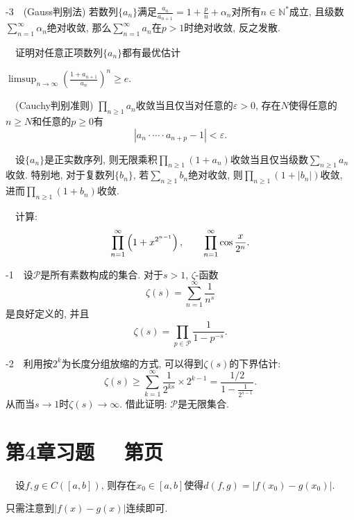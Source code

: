-3~~(Gauss判别法) 若数列$\{ a_n \}$满足$\frac{a_n}{a_{n+1}}=1+\frac{p}{n} +\alpha _n$对所有$n \in \mathbb{N}^*$成立, 且级数$\sum_{n=1}^{\infty} \alpha _n$绝对收敛, 那么$\sum_{n=1}^{\infty} a_n$在$p>1$时绝对收敛, 反之发散. 
\vspace{1em}

~~证明对任意正项数列$\{ a_n \}$都有{\color{blue}最优}估计
\begin{center}
	$\displaystyle \limsup_{n\to \infty} \left(\frac{1+a_{n+1}}{a_n} \right)^n \geq e.$
\end{center}

~~(Cauchy判别准则) $\prod_{n \geq 1}a_n$收敛当且仅当对任意的$\varepsilon >0$, 存在$N$使得任意的$n \geq N$和任意的$p \geq 0$有$$|a_n \cdot \cdots \cdot a_{n+p}-1|<\varepsilon .$$

~~设$\{ a_n \}$是正实数序列, 则无限乘积$\prod_{n \geq 1} (1+a_n)$收敛当且仅当级数$\sum_{n\geq 1}a_n$收敛. 特别地, 对于复数列$\{ b_n \}$, 若$\sum_{n\geq 1}b_n$绝对收敛, 则$\prod_{n \geq 1} (1+|b_n|)$收敛, 进而$\prod_{n \geq 1} (1+b_n)$收敛. 
\vspace{1em}

~~计算: $$\prod_{n=1}^{\infty} \left( 1+x^{2^{n-1}} \right),\qquad \prod_{n=1}^{\infty} \cos \frac{x}{2^n}.$$

-1~~设$\mathcal{P}$是所有素数构成的集合. 对于$s>1$, $\zeta$-函数$$\zeta (s) = \sum_{n=1}^{\infty} \frac{1}{n^s}$$
是良好定义的, 并且$$\zeta (s) = \prod_{p \in \mathcal{P}} \frac{1}{1-p^{-s}}. $$

-2~~利用按$2^k$为长度分组放缩的方式, 可以得到$\zeta (s)$的下界估计: $$\zeta (s) \geq \sum_{k=1}^{\infty} \frac{1}{2^{ks}} \times 2^{k-1} = \frac{1/2}{1-\frac{1}{2^{s-1}}}.$$
从而当$s \to 1$时$\zeta (s) \to \infty$. 借此证明: $\mathcal{P}$是无限集合. 









\newpage
\section*{第4章习题 ~~\small 第\pageref{sec:ex4.1}页}

~~设$f,g \in C([a,b])$, 则存在$x_0 \in [a,b]$使得$d(f,g) = |f(x_0)-g(x_0)|$. 

\begin{exsolution}
	只需注意到$|f(x)-g(x)|$连续即可. 
\end{exsolution}

